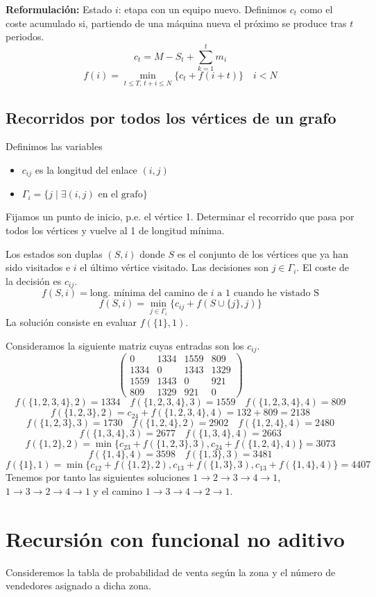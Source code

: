 \documentclass[MIOP.tex]{subfiles}
\begin{document}
{\bf Reformulación:} Estado $i$: etapa con un equipo nuevo. Definimos $c_t$ como el coste acumulado si, partiendo de una máquina nueva el próximo se produce tras $t$ periodos. 
$$
c_t = M - S_t + \sum_{k=1}^t m_i
$$
$$
f(i) =\min_{t\leq T,\,t+i\leq N} \{c_t+f(i+t)\}\quad i<N
$$
\subsection{Recorridos por todos los vértices de un grafo}
Definimos las variables
\begin{itemize}
\item $c_{ij}$ es la longitud del enlace $(i,j)$
\item $\Gamma_i = \{j \mid \exists (i,j) \text{ en el grafo}\}$
\end{itemize}
Fijamos un punto de inicio, p.e. el vértice 1. Determinar el recorrido que pasa por todos los vértices y vuelve al 1 de longitud mínima.

Los estados son duplas $(S,i)$ donde $S$ es el conjunto de los vértices que ya han sido visitados e $i$ el último vértice visitado. Las decisiones son $j\in\Gamma_i$. El coste de la decisión es $c_{ij}$.
$$
f(S,i)= \text{long. mínima del camino de $i$ a 1 cuando he vistado S}
$$
$$f(S,i) = \min_{j\in\Gamma_i}\{c_{ij}+f(S\cup\{j\},j)\}
$$
La solución consiste en evaluar $f(\{1\},1)$. 
\begin{ej} Consideramos la siguiente matriz cuyas entradas son los $c_{ij}$.
$$
\begin{pmatrix}
0 & 1334 & 1559 & 809\\
1334 & 0 & 1343 & 1329\\
1559 & 1343 & 0 &  921\\
809& 1329& 921 & 0
\end{pmatrix}
$$
$$
f(\{1,2,3,4\},2) = 1334 \quad f(\{1,2,3,4\},3) = 1559 \quad f(\{1,2,3,4\},4) = 809
$$
$$
f(\{1,2,3\},2) = c_{24}+ f(\{1,2,3,4\},4) = 132+809=2138
$$
$$
f(\{1,2,3\},3) = 1730 \quad f(\{1,2,4\},2) = 2902 \quad f(\{1,2,4\},4) = 2480
$$
$$
f(\{1,3,4\},3) = 2677 \quad f(\{1,3,4\},4)=2663
 $$
 $$
 f(\{1,2\},2) = \min\{c_{23}+f(\{1,2,3\},3), c_{24}+f(\{1,2,4\},4)\} = 3073
 $$
 $$
 f(\{1,4\},4) = 3598 \quad f(\{1,3\},3) = 3481
 $$
 $$
 f(\{1\},1) = \min\{c_{12}+f(\{1,2\},2), c_{13}+f(\{1,3\},3), c_{13}+f(\{1,4\},4)\} = 4407
 $$
Tenemos por tanto las siguientes soluciones $1\to 2 \to 3 \to 4 \to 1$, $1\to 3 \to 2 \to 4 \to 1$ y el camino $ 1 \to 3 \to 4 \to 2 \to 1$.
\end{ej}
\section{Recursión con funcional no aditivo}
Consideremos la tabla de probabilidad de venta según la zona y el número de vendedores asignado a dicha zona.
\end{document}
